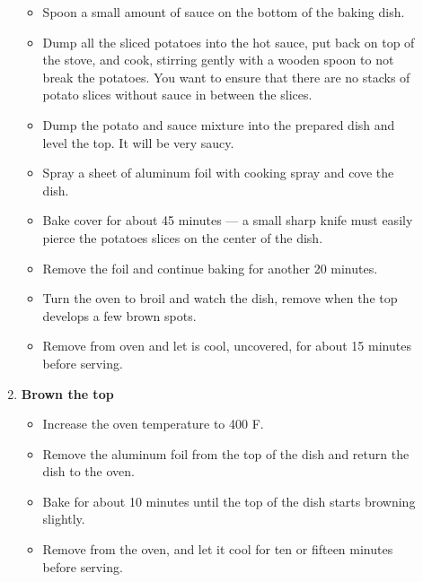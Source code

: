 \documentclass[11pt,letterpaper]{article}
\newcommand \fileName {ScallopedPotatoes}
\begin{document}
\begin{description}
\begin{enumerate}
\begin{itemize}
		\item Spoon a small amount of sauce on the bottom of the baking dish.
		\item Dump all the sliced potatoes into the hot sauce, put back on top of the stove, and cook, stirring gently with a wooden spoon to not break the potatoes. You want to ensure that there are no stacks of potato slices without sauce in between the slices.
		\item Dump the potato and sauce mixture into the prepared dish and level the top. It will be very saucy.
		\item Spray a sheet of aluminum foil with cooking spray and cove the dish.
		\item Bake cover for about 45 minutes --- a small sharp knife must easily pierce the potatoes slices on the center of the dish.
		\item Remove the foil and continue baking for another 20 minutes.
		\item Turn the oven to broil and watch the dish, remove when the top develops a few brown spots.
		\item Remove from oven and let is cool, uncovered, for about 15 minutes before serving.
		\end{itemize}
	\item{\bf Brown the top}
		\begin{itemize}
        		\item Increase the oven temperature to 400 F.
		\item Remove the aluminum foil from the top of the dish and return the dish to the oven.
		\item Bake for about 10 minutes until the top of the dish starts browning slightly.
		\item Remove from the oven, and let it cool for ten or fifteen minutes before serving.	
		\end{itemize} 	
     	\end{enumerate}         
\end{description}

\end{document}
